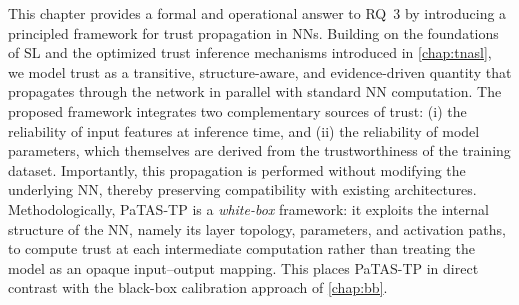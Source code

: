 This chapter provides a formal and operational answer to \ac{RQ}~3 by introducing a principled framework for trust propagation in \acp{NN}. Building on the foundations of \ac{SL} and the optimized trust inference mechanisms introduced in \cref{chap:tnasl}, we model trust as a transitive, structure-aware, and evidence-driven quantity that propagates through the network in parallel with standard \ac{NN} computation. The proposed framework integrates two complementary sources of trust: (i) the reliability of input features at inference time, and (ii) the reliability of model parameters, which themselves are derived from the trustworthiness of the training dataset. Importantly, this propagation is performed without modifying the underlying \ac{NN}, thereby preserving compatibility with existing architectures. Methodologically, \ac{PaTAS-TP} is a \emph{white-box} framework: it exploits the internal structure of the \ac{NN}, namely its layer topology, parameters, and activation paths, to compute trust at each intermediate computation rather than treating the model as an opaque input--output mapping. This places \ac{PaTAS-TP} in direct contrast with the black-box calibration approach of \cref{chap:bb}.

